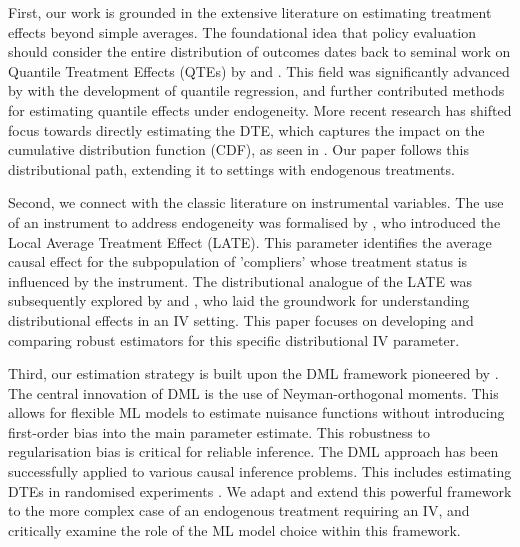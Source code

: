 \documentclass[final,3p,fleqn, 10pt]{elsarticle}
\begin{document}
First, our work is grounded in the extensive literature on estimating treatment effects beyond simple averages. The foundational idea that policy evaluation should consider the entire distribution of outcomes dates back to seminal work on Quantile Treatment Effects (QTEs) by \citet{doksum1974empirical} and \citet{lehmann1975nonparametrics}. This field was significantly advanced by \citet{koenker2005quantile} with the development of quantile regression, and \citet{firpo2007efficient} further contributed methods for estimating quantile effects under endogeneity. More recent research has shifted focus towards directly estimating the DTE, which captures the impact on the cumulative distribution function (CDF), as seen in \citet{chernozhukov2013inference}. Our paper follows this distributional path, extending it to settings with endogenous treatments.

Second, we connect with the classic literature on instrumental variables. The use of an instrument to address endogeneity was formalised by \citet{angrist1996identification}, who introduced the Local Average Treatment Effect (LATE). This parameter identifies the average causal effect for the subpopulation of 'compliers' whose treatment status is influenced by the instrument. The distributional analogue of the LATE was subsequently explored by \citet{imbens1997estimating} and \citet{abadie2002bootstrap}, who laid the groundwork for understanding distributional effects in an IV setting. This paper focuses on developing and comparing robust estimators for this specific distributional IV parameter.

Third, our estimation strategy is built upon the DML framework pioneered by \citet{chernozhukov2018debiased}. The central innovation of DML is the use of Neyman-orthogonal moments. This allows for flexible ML models to estimate nuisance functions without introducing first-order bias into the main parameter estimate. This robustness to regularisation bias is critical for reliable inference. The DML approach has been successfully applied to various causal inference problems. This includes estimating DTEs in randomised experiments \citep{byambadalai24a}. We adapt and extend this powerful framework to the more complex case of an endogenous treatment requiring an IV, and critically examine the role of the ML model choice within this framework.
\end{document}
